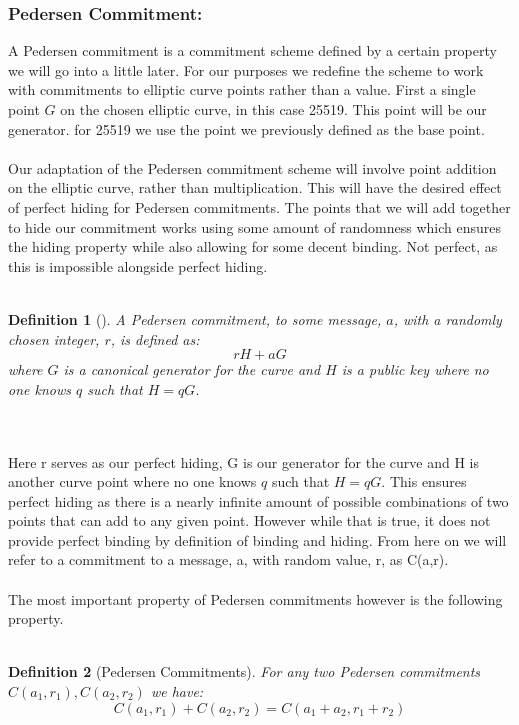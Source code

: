 \documentclass{article}
\newtheorem{definition}{Definition}[section]
\begin{document}
\subsubsection{Pedersen Commitment:}

A Pedersen commitment is a commitment scheme defined by a certain property we will go into a little later. For our purposes we redefine the scheme to work with commitments to elliptic curve points rather than a value. First a single point $G$ on the chosen elliptic curve, in this case 25519. This point will be our generator. for 25519 we use the point we previously defined as the base point. 
\\\\
Our adaptation of the Pedersen commitment scheme will involve point addition on the elliptic curve, rather than multiplication. This will have the desired effect of perfect hiding for Pedersen commitments. The points that we will add together to hide our commitment works using some amount of randomness which ensures the hiding property while also allowing for some decent binding. Not perfect, as this is impossible alongside perfect hiding. 
\\\\
\begin{definition}[]
A Pedersen commitment, to some message, $a$, with a randomly chosen integer, $r$, is defined as:
$$rH + aG$$
where $G$ is a canonical generator for the curve and $H$ is a public key where no one knows $q$ such that $H = qG$.
\end{definition}
\\\\
Here r serves as our perfect hiding, G is our generator for the curve and H is another curve point where no one knows $q$ such that $H = qG$. This ensures perfect hiding as there is a nearly infinite amount of possible combinations of two points that can add to any given point. However while that is true, it does not provide perfect binding by definition of binding and hiding. From here on we will refer to a commitment to a message, a, with random value, r, as C(a,r).
\\\\
The most important property of Pedersen commitments however is the following property. 
\\\\
\begin{definition}[Pedersen Commitments]
For any two Pedersen commitments $C(a_1,r_1), C(a_2,r_2)$ we have:
$$ C(a_1,r_1) + C(a_2,r_2) = C(a_1 + a_2, r_1 + r_2)$$
\end{definition}
\end{document}
